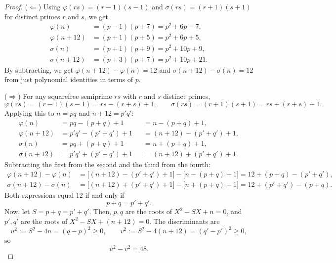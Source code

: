 \documentclass[12pt, twoside]{amsart}
\theoremstyle{definition}
\begin{document}
\begin{proof}
($\Leftarrow$) Using $\varphi(rs) = (r-1)(s-1)$ and $\sigma(rs) = (r+1)(s+1)$ for distinct primes $r$ and $s$, we get
\begin{align*}
\varphi(n) &= (p-1)(p+7) = p^2 + 6p - 7, \\
\varphi(n+12) &= (p+1)(p+5) = p^2 + 6p + 5, \\
\sigma(n) &= (p+1)(p+9) = p^2 + 10p + 9, \\
\sigma(n+12) &= (p+3)(p+7) = p^2 + 10p + 21.
\end{align*}
By subtracting, we get $\varphi(n+12) - \varphi(n) = 12$ and $\sigma(n+12) - \sigma(n) = 12$ from just polynomial identities in terms of $p$.

($\Rightarrow$) For any squarefree semiprime $rs$ with $r$ and $s$ distinct primes,
\[
\varphi(rs) = (r-1)(s-1)=rs - (r+s) + 1, \qquad \sigma(rs) = (r+1)(s+1) = rs + (r+s) + 1.
\]
Applying this to $n = pq$ and $n+12 = p'q'$:
\begin{align*}
\varphi(n)      &= pq - (p+q) + 1                       &&= n - (p+q) + 1, \\
\varphi(n+12)   &= p'q' - (p'+q') + 1                   &&= (n+12) - (p'+q') + 1, \\
\sigma(n)       &= pq + (p+q) + 1                       &&= n + (p+q) + 1, \\
\sigma(n+12)    &= p'q' + (p'+q') + 1                   &&= (n+12) + (p'+q') + 1.
\end{align*}
Subtracting the first from the second and the third from the fourth:
\begin{align*}
\varphi(n+12) - \varphi(n) &= \bigl[(n+12) - (p'+q') + 1\bigr] - \bigl[n - (p+q) + 1\bigr] = 12 + (p+q) - (p'+q'), \\
\sigma(n+12)  - \sigma(n)  &= \bigl[(n+12) + (p'+q') + 1\bigr] - \bigl[n + (p+q) + 1\bigr] = 12 + (p'+q') - (p+q).
\end{align*}
Both expressions equal $12$ if and only if
\begin{equation}\label{eq:sum-eq}
p + q = p' + q'.
\end{equation}
Now, let $S = p+q = p'+q'$. Then, $p, q$ are the roots of $X^2 - SX + n = 0$, and $p', q'$ are the roots of $X^2 - SX + (n+12) = 0$. The discriminants are
\[
u^2 := S^2 - 4n = (q - p)^2 \ge 0, \qquad v^2 := S^2 - 4(n+12) = (q' - p')^2 \ge 0,
\]
so
\begin{equation}\label{eq:disc-diff}
u^2 - v^2 = 48.
\end{equation}


\end{proof}
\end{document}
